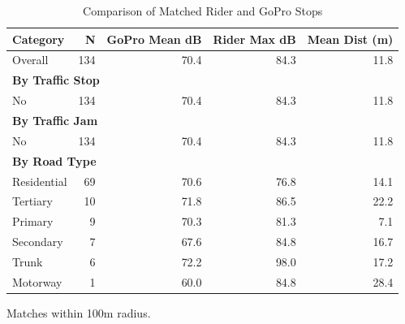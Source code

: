 \begin{table}[htbp]
\centering
\caption{Comparison of Matched Rider and GoPro Stops}
\label{tab:compare_summary}
\begin{tabular}{lrrrr}
\toprule
Category & N & GoPro Mean dB & Rider Max dB & Mean Dist (m) \\
\midrule
Overall & 134 & 70.4 & 84.3 & 11.8 \\
\midrule
\multicolumn{5}{l}{\textbf{By Traffic Stop}} \\
No & 134 & 70.4 & 84.3 & 11.8 \\
\midrule
\multicolumn{5}{l}{\textbf{By Traffic Jam}} \\
No & 134 & 70.4 & 84.3 & 11.8 \\
\midrule
\multicolumn{5}{l}{\textbf{By Road Type}} \\
Residential & 69 & 70.6 & 76.8 & 14.1 \\
Tertiary & 10 & 71.8 & 86.5 & 22.2 \\
Primary & 9 & 70.3 & 81.3 & 7.1 \\
Secondary & 7 & 67.6 & 84.8 & 16.7 \\
Trunk & 6 & 72.2 & 98.0 & 17.2 \\
Motorway & 1 & 60.0 & 84.8 & 28.4 \\
\bottomrule
\end{tabular}
\begin{tablenotes}
\small
\item Matches within 100m radius.
\end{tablenotes}
\end{table}
